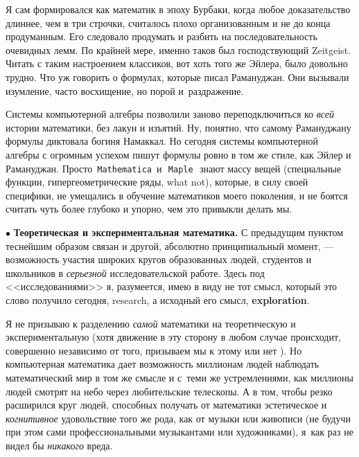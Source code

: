 \documentclass[intlimits,twoside,a4paper,11pt]{article}
\begin{document}
		Я сам формировался как математик в эпоху Бурбаки, когда любое доказательство
		длиннее, чем в три строчки, считалось плохо организованным и не до конца 
		продуманным. Его следовало продумать и разбить на последовательность 
		очевидных лемм. По крайней мере, именно таков был господствующий Zeitgeist.
		Читать с таким настроением классиков, вот хоть того же Эйлера, было довольно
		трудно. Что уж говорить о формулах, которые писал Рамануджан. Они вызывали
		изумление, часто восхищение, но порой и~раздражение. 
		
		Системы компьютерной алгебры позволили заново переподключиться ко {\it всей\/} 
		истории математики, без лакун и изъятий. Ну, понятно, что самому Рамануджану 
		формулы диктовала богиня 
		Намаккал. Но сегодня системы компьютерной алгебры с огромным успехом пишут 
		формулы ровно в том же стиле, как Эйлер и Рамануджан. Просто \,{\tt Mathematica}\,
		и \,\,{\tt Maple}\,\, знают
		массу вещей (специальные функции, гипергеометриче\-ские ряды, what 
		not), которые, в силу своей специфики, не умещались в обучение математиков
		моего поколения, и не боятся считать чуть более глубоко и упорно, чем это
		привыкли делать мы.
		
		\par\smallskip
		$\bullet$  {\bf Теоретическая и экспериментальная математика.} С предыдущим
		пунктом теснейшим образом связан и другой, абсолютно принципиальный момент, ---
		возможность участия широких кругов образованных людей, студентов и 
		школьников в {\it серьезной\/} исследовательской работе. Здесь под <<исследованиями>>
		я, разумеется, имею в виду не тот смысл, который это слово получило сегодня,
		research,
		а исходный его смысл, {\bf exploration}.
		
		Я не призываю к разделению {\it самой\/} математики на теоретическую и экспериментальную
		(хотя движение в эту сторону в любом случае происходит, совершенно независимо 
		от того, призываем мы к этому или нет \cite{BB05, BB11}). Но компьютерная 
		математика дает возможность миллионам людей наблюдать математический мир 
		в том же смысле и с~теми же устремлениями, как миллионы людей смотрят на 
		небо через любительские телескопы. А в том, чтобы резко расширился круг людей,
		способных получать от математики эстетическое и {\it когнитивное\/} удовольствие
		того же рода, как от музыки или живописи (не будучи при этом сами 
		профессиональными музыкантами или художниками), я~как раз не видел бы 
		{\it никакого\/} вреда.
		
		
\end{document}
